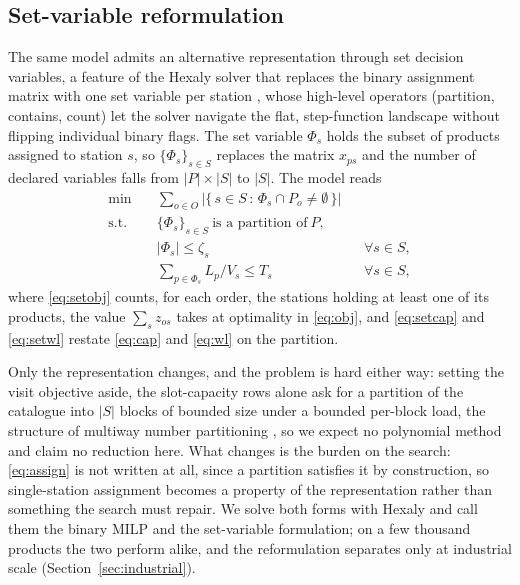 \documentclass[]{interact}
\begin{document}
\subsection{Set-variable reformulation}\label{sec:setvar}
The same model admits an alternative representation through set decision variables, a feature of the Hexaly solver that replaces the binary assignment matrix with one set variable per station \citep{blaisemodeling}, whose high-level operators (partition, contains, count) let the solver navigate the flat, step-function landscape without flipping individual binary flags. The set variable $\Phi_s$ holds the subset of products assigned to station $s$, so $\{\Phi_s\}_{s \in S}$ replaces the matrix $x_{ps}$ and the number of declared variables falls from $|P|\times|S|$ to $|S|$. The model reads
\begin{align}
\min \quad & \sum_{o \in O} \bigl|\{\, s \in S \,:\, \Phi_s \cap P_o \neq \emptyset \,\}\bigr| \label{eq:setobj}\\
\text{s.t.} \quad & \{\Phi_s\}_{s \in S}\ \text{is a partition of}\ P, \label{eq:setpart}\\
& |\Phi_s| \le \zeta_s && \forall s \in S, \label{eq:setcap}\\
& \sum_{p \in \Phi_s} L_p / V_s \le T_s && \forall s \in S, \label{eq:setwl}
\end{align}
where \eqref{eq:setobj} counts, for each order, the stations holding at least one of its products, the value $\sum_{s} z_{os}$ takes at optimality in \eqref{eq:obj}, and \eqref{eq:setcap} and \eqref{eq:setwl} restate \eqref{eq:cap} and \eqref{eq:wl} on the partition.

Only the representation changes, and the problem is hard either way: setting the visit objective aside, the slot-capacity rows alone ask for a partition of the catalogue into $|S|$ blocks of bounded size under a bounded per-block load, the structure of multiway number partitioning \citep{garey1979computers}, so we expect no polynomial method and claim no reduction here. What changes is the burden on the search: \eqref{eq:assign} is not written at all, since a partition satisfies it by construction, so single-station assignment becomes a property of the representation rather than something the search must repair. We solve both forms with Hexaly and call them the binary MILP and the set-variable formulation; on a few thousand products the two perform alike, and the reformulation separates only at industrial scale (Section~\ref{sec:industrial}).

\end{document}
